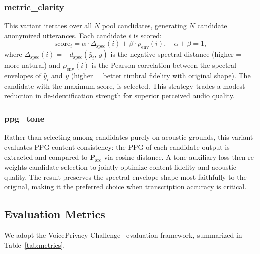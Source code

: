 \documentclass[conference]{IEEEtran}
\begin{document}
\subsubsection{metric\_clarity}
This variant iterates over all $N$ pool candidates, generating $N$
candidate anonymized utterances.  Each candidate $i$ is scored:
\begin{equation}
  \text{score}_i =
    \alpha \cdot \Delta_\text{spec}(i)
    + \beta  \cdot \rho_\text{env}(i),
  \quad \alpha+\beta=1,
  \label{eq:clarity}
\end{equation}
where $\Delta_\text{spec}(i) = -d_\text{spec}(\hat{y}_i,\, y)$
is the negative spectral distance (higher = more natural) and
$\rho_\text{env}(i)$ is the Pearson correlation between the
spectral envelopes of $\hat{y}_i$ and $y$ (higher = better
timbral fidelity with original shape).  The candidate with the
maximum $\text{score}_i$ is selected.  This strategy trades a
modest reduction in de-identification strength for superior
perceived audio quality.

\subsubsection{ppg\_tone}
Rather than selecting among candidates purely on acoustic grounds,
this variant evaluates PPG content consistency: the PPG of each
candidate output is extracted and compared to
$\mathbf{P}_\text{src}$ via cosine distance.  A tone auxiliary
loss then re-weights candidate selection to jointly optimize content
fidelity and acoustic quality.  The result preserves the spectral
envelope shape most faithfully to the original, making it the
preferred choice when transcription accuracy is critical.

\subsection{Evaluation Metrics}

We adopt the VoicePrivacy Challenge~\cite{b_voiceprivacy2020}
evaluation framework, summarized in Table~\ref{tab:metrics}.
\end{document}
